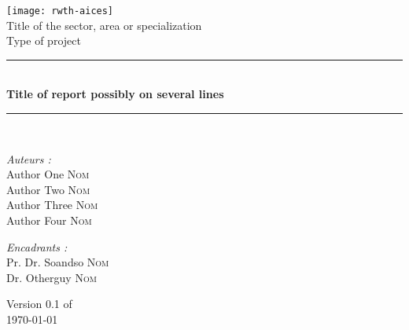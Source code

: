 
\begin{titlepage}
    \begin{center}

        \texttt{[image: rwth-aices]}\\[1cm]

        {\large Title of the sector, area or specialization}\\[0.5cm]


        {\large Type of project}\\[0.5cm]

        \rule{\linewidth}{0.5mm} \\[0.4cm]
        { \huge \bfseries Title of report possibly on several lines \\[0.4cm] }
        \rule{\linewidth}{0.5mm} \\[1.5cm]

        \noindent
        \begin{minipage}{0.4\textwidth}
            \begin{flushleft} \large
                \emph{Auteurs :}\\
                Author One \textsc{Nom}\\
                Author Two \textsc{Nom}\\
                Author Three \textsc{Nom}\\
                Author Four \textsc{Nom}
            \end{flushleft}
        \end{minipage}%
        \begin{minipage}{0.4\textwidth}
            \begin{flushright} \large
                \emph{Encadrants :} \\
                Pr. Dr. Soandso \textsc{Nom}\\
                Dr. Otherguy \textsc{Nom}
            \end{flushright}
        \end{minipage}

        \vfill

        {\large Version 0.1 of\\ \today}

    \end{center}
\end{titlepage}



